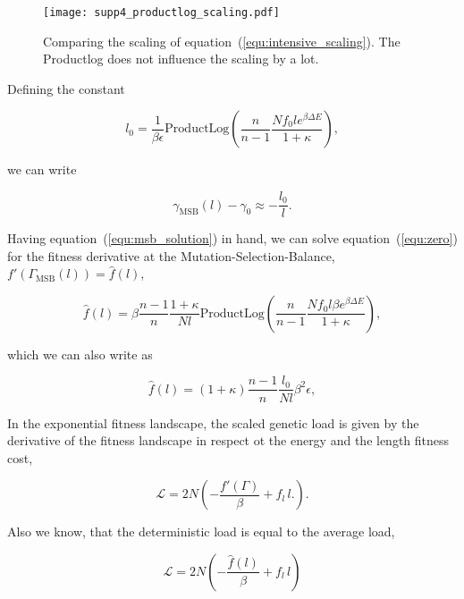 \documentclass[10pt,a4paper]{article}
\newcommand{\productlog}{\mathrm{ProductLog}}
\begin{document}
\begin{figure}
	\centering
	\texttt{[image: supp4\_productlog\_scaling.pdf]}
	\caption{Comparing the scaling of equation~(\ref{equ:intensive_scaling}). The Productlog does not influence the scaling by a lot.}\label{fig:prodlog_scaling}
\end{figure}

\noindent Defining the constant

\begin{equation}
	l_0 = \frac{1}{\beta\epsilon}\productlog \left(\frac{n}{n-1}\frac{ Nf_0l e^{\beta\Delta E}}{1+\kappa}\right),\label{equ:l0_def}
\end{equation}

\noindent we can write

\begin{equation}
\gamma_\mathrm{MSB}(l) - \gamma_0\approx -\frac{l_0}{l}. \label{equ:intensive_scaling2}
\end{equation}

\noindent Having equation~(\ref{equ:msb_solution}) in hand, we can solve equation~(\ref{equ:zero}) for the fitness derivative at the Mutation-Selection-Balance,
 $f'\left(\Gamma_\mathrm{MSB}(l)\right)=\hat{f}(l)$,

 \begin{equation}
	\hat{f}(l) = \beta\frac{n-1}{n}\frac{1+\kappa}{N l}\productlog\left(\frac{n}{n-1}\frac{ Nf_0l\beta e^{\beta\Delta E}}{1+\kappa}\right),
\end{equation}

\noindent which we can also write as

\begin{equation}
\hat{f}(l) =  (1+\kappa)\frac{n-1}{n}\frac{l_0}{N l}\beta^2\epsilon, \label{equ:fitness_der_scaling}
\end{equation}

\noindent In the exponential fitness landscape, the scaled genetic load is given by the derivative of the fitness landscape in respect ot the energy and the length fitness cost,

\begin{equation}
	\mathcal{L}= 2N\left(-\frac{f'(\Gamma)}{\beta}+f_l\,l.\right).
\end{equation}

\noindent Also we know, that the deterministic load is equal to the average load,

\begin{equation}
	\mathcal{L}= 2N\left(-\frac{\hat{f}(l)}{\beta}+f_l\,l\right)
\end{equation}
\end{document}
